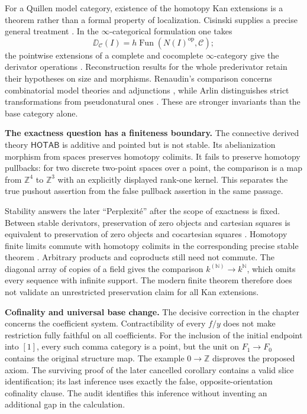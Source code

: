 For a Quillen model category, existence of the homotopy Kan extensions is a theorem rather than a formal property of localization. Cisinski supplies a precise general treatment \citep[Theorem~6.11]{Cisinski2003}. In the $\infty$-categorical formulation one takes
\[
 \DD_{\mathcal C}(I)=h\operatorname{Fun}(N(I)^{\mathrm{op}},\mathcal C);
\]
the pointwise extensions of a complete and cocomplete $\infty$-category give the derivator operations \citep[\S5.3]{RiehlVerity2017}. Reconstruction results for the whole prederivator retain their hypotheses on size and morphisms. Renaudin's comparison concerns combinatorial model theories and adjunctions \citep[Theorems~3.3.2 and~3.4.4]{Renaudin2009}, while Arlin distinguishes strict transformations from pseudonatural ones \citep[Theorems~19 and~29]{Arlin2020}. These are stronger invariants than the base category alone.

\medskip\noindent\textbf{The exactness question has a finiteness boundary.}
The connective derived theory $\mathsf{HOTAB}$ is additive and pointed but is not stable. Its abelianization morphism from spaces preserves homotopy colimits. It fails to preserve homotopy pullbacks: for two discrete two-point spaces over a point, the comparison is a map from $\mathbb Z^4$ to $\mathbb Z^3$ with an explicitly displayed rank-one kernel. This separates the true pushout assertion from the false pullback assertion in the same passage.

Stability answers the later ``Perplexit\'e'' after the scope of exactness is fixed. Between stable derivators, preservation of zero objects and cartesian squares is equivalent to preservation of zero objects and cocartesian squares \citep[Corollary~4.17]{Groth2013}. Homotopy finite limits commute with homotopy colimits in the corresponding precise stable theorem \citep[Theorem~2.14]{GrothShulman2017}. Arbitrary products and coproducts still need not commute. The diagonal array of copies of a field gives the comparison $k^{(\mathbb N)}\to k^{\mathbb N}$, which omits every sequence with infinite support. The modern finite theorem therefore does not validate an unrestricted preservation claim for all Kan extensions.

\medskip\noindent\textbf{Cofinality and universal base change.}
The decisive correction in the chapter concerns the coefficient system. Contractibility of every $f/y$ does not make restriction fully faithful on all coefficients. For the inclusion of the initial endpoint into $[1]$, every such comma category is a point, but the unit on $F_1\to F_0$ contains the original structure map. The example $0\to\mathbb Z$ disproves the proposed axiom. The surviving proof of the later cancelled corollary contains a valid slice identification; its last inference uses exactly the false, opposite-orientation cofinality clause. The audit identifies this inference without inventing an additional gap in the calculation.

